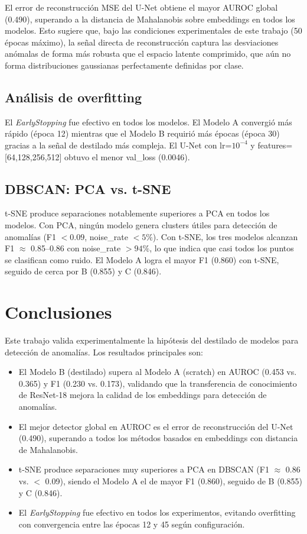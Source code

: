 \documentclass[conference]{IEEEtran}
\begin{document}
El error de reconstrucción MSE del U-Net obtiene el mayor AUROC global (0.490),
superando a la distancia de Mahalanobis sobre embeddings en todos los modelos.
Esto sugiere que, bajo las condiciones experimentales de este trabajo (50 épocas
máximo), la señal directa de reconstrucción captura las desviaciones anómalas
de forma más robusta que el espacio latente comprimido, que aún no forma
distribuciones gaussianas perfectamente definidas por clase.

\subsection{Análisis de overfitting}

El \textit{EarlyStopping} fue efectivo en todos los modelos. El Modelo A
convergió más rápido (época 12) mientras que el Modelo B requirió más épocas
(época 30) gracias a la señal de destilado más compleja. El U-Net con
lr=$10^{-4}$ y features=[64,128,256,512] obtuvo el menor val\_loss (0.0046).

\subsection{DBSCAN: PCA vs. t-SNE}

t-SNE produce separaciones notablemente superiores a PCA en todos los modelos.
Con PCA, ningún modelo genera clusters útiles para detección de anomalías
(F1 $< 0.09$, noise\_rate $< 5\%$). Con t-SNE, los tres modelos alcanzan
F1 $\approx$ 0.85--0.86 con noise\_rate $> 94\%$, lo que indica que casi
todos los puntos se clasifican como ruido. El Modelo A logra el mayor F1 (0.860)
con t-SNE, seguido de cerca por B (0.855) y C (0.846).

\section{Conclusiones}

Este trabajo valida experimentalmente la hipótesis del destilado de modelos para
detección de anomalías. Los resultados principales son:

\begin{itemize}
  \item El Modelo B (destilado) supera al Modelo A (scratch) en AUROC
        (0.453 vs. 0.365) y F1 (0.230 vs. 0.173), validando que la
        transferencia de conocimiento de ResNet-18 mejora la calidad de
        los embeddings para detección de anomalías.
  \item El mejor detector global en AUROC es el error de reconstrucción
        del U-Net (0.490), superando a todos los métodos basados en
        embeddings con distancia de Mahalanobis.
  \item t-SNE produce separaciones muy superiores a PCA en DBSCAN
        (F1 $\approx$ 0.86 vs. $<$ 0.09), siendo el Modelo A el de
        mayor F1 (0.860), seguido de B (0.855) y C (0.846).
  \item El \textit{EarlyStopping} fue efectivo en todos los experimentos,
        evitando overfitting con convergencia entre las épocas 12 y 45
        según configuración.
\end{itemize}
\end{document}
